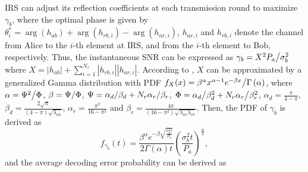 \documentclass[conference]{IEEEtran}
\begin{document}
IRS can adjust its reflection coefficients at each transmission round to maximize $\gamma_b$, where the optimal
phase is given by $\theta _i^* = \arg \left( {{h_{ab}}} \right) + \arg \left( {{h_{rb,i}}} \right) - \arg \left( {{h_{ar,i}}} \right)$, ${{h_{ar,i}}}$ and ${{h_{rb,i}}}$ denote the channel from Alice to the $i$-th element at IRS, and from the $i$-th element to Bob, respectively. Thus, the instantaneous SNR can be expressed as ${\gamma _b} = {{{X^2}{P_a}} \mathord{\left/
		{\vphantom {{{X^2}{P_a}} {\sigma _b^2}}} \right.
		\kern-\nulldelimiterspace} {\sigma _b^2}}$ where $X = \left| {{h_{ab}}} \right| + \sum\limits_{i = 1}^{{N_r}} {\left| {{h_{rb,i}}} \right|\left| {{h_{ar,i}}} \right|}$. According to \cite[Lemma 1]{short_IRS2}, $X$ can be approximated by a generalized Gamma distribution with PDF ${f_X}(x) = {{{\beta ^\alpha }{x^{\alpha  - 1}}{e^{ - \beta x}}} \mathord{\left/
		{\vphantom {{{\beta ^\alpha }{x^{\alpha  - 1}}{e^{ - \beta x}}} {\Gamma \left( \alpha  \right)}}} \right.
		\kern-\nulldelimiterspace} {\Gamma \left( \alpha  \right)}}$, where $\alpha  = {{{\Psi ^2}} \mathord{\left/
		{\vphantom {{{\Psi ^2}} \Phi }} \right.
		\kern-\nulldelimiterspace} \Phi }$, $\beta  = {\Psi  \mathord{\left/
		{\vphantom {\Psi  \Phi }} \right.
		\kern-\nulldelimiterspace} \Phi }$, $\Psi  = {{{\alpha _d}} \mathord{\left/
		{\vphantom {{{\alpha _d}} {{\beta _d}}}} \right.
		\kern-\nulldelimiterspace} {{\beta _d}}} + {N_r}{{{\alpha _r}} \mathord{\left/
		{\vphantom {{{\alpha _r}} {{\beta _r}}}} \right.
		\kern-\nulldelimiterspace} {{\beta _r}}}$, $\Phi  = {{{\alpha _d}} \mathord{\left/
		{\vphantom {{{\alpha _d}} {\beta _d^2}}} \right.
		\kern-\nulldelimiterspace} {\beta _d^2}} + {N_r}{{{\alpha _r}} \mathord{\left/
		{\vphantom {{{\alpha _r}} {\beta _r^2}}} \right.
		\kern-\nulldelimiterspace} {\beta _r^2}}$, ${\alpha _{{d}}} = \frac{\pi }{{4 - \pi }}$, ${\beta _{{d}}} = \frac{{2\sqrt \pi  }}{{(4 - \pi )\sqrt {{\lambda _{ab}}} }}$, ${\alpha _{{r}}} = \frac{{{\pi ^2}}}{{16 - {\pi ^2}}}$ and ${\beta _{{r}}} = \frac{{4\pi }}{{\left( {16 - {\pi ^2}} \right)\sqrt {{\lambda _{ar}}{\lambda _{rb}}} }}$. Then, the PDF of $\gamma_b$ is derived as
\begin{equation}
	{f_{{\gamma _b}}}(t) = \frac{{{\beta ^\alpha }{e^{ - \beta \sqrt {\frac{{\sigma _b^2t}}{{{P_a}}}} }}}}{{2\Gamma \left( \alpha  \right)t}}{\left( {\frac{{\sigma _b^2t}}{{{P_a}}}} \right)^{\frac{\alpha }{2}}},
\end{equation}
and the average decoding error probability can be derived as
\end{document}
